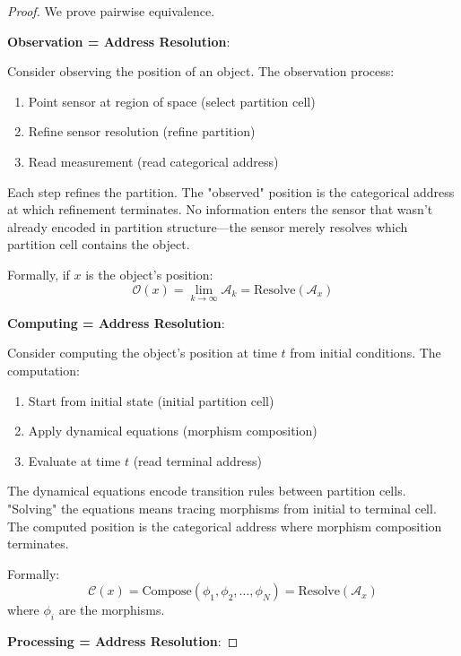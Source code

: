 \documentclass[twocolumn,10pt]{article}
\theoremstyle{definition}
\theoremstyle{remark}
\newcommand{\cataddr}{\mathcal{A}}
\begin{document}
\begin{proof}
We prove pairwise equivalence.

\textbf{Observation = Address Resolution}:

Consider observing the position of an object. The observation process:
\begin{enumerate}
    \item Point sensor at region of space (select partition cell)
    \item Refine sensor resolution (refine partition)
    \item Read measurement (read categorical address)
\end{enumerate}

Each step refines the partition. The "observed" position is the categorical address at which refinement terminates. No information enters the sensor that wasn't already encoded in partition structure—the sensor merely resolves which partition cell contains the object.

Formally, if $x$ is the object's position:
\begin{equation}
    \mathcal{O}(x) = \lim_{k \to \infty} \cataddr_k = \text{Resolve}(\cataddr_x)
\end{equation}

\textbf{Computing = Address Resolution}:

Consider computing the object's position at time $t$ from initial conditions. The computation:
\begin{enumerate}
    \item Start from initial state (initial partition cell)
    \item Apply dynamical equations (morphism composition)
    \item Evaluate at time $t$ (read terminal address)
\end{enumerate}

The dynamical equations encode transition rules between partition cells. "Solving" the equations means tracing morphisms from initial to terminal cell. The computed position is the categorical address where morphism composition terminates.

Formally:
\begin{equation}
    \mathcal{C}(x) = \text{Compose}(\phi_1, \phi_2, \ldots, \phi_N) = \text{Resolve}(\cataddr_x)
\end{equation}
where $\phi_i$ are the morphisms.

\textbf{Processing = Address Resolution}:


\end{proof}
\end{document}
